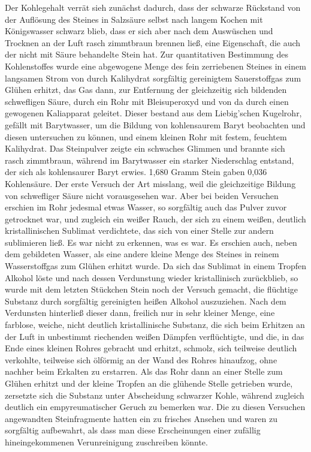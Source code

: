 \documentclass[a4paper, 11pt, oneside]{article}
\begin{document}
Der Kohlegehalt verrät sieh zunächst dadurch, dass der schwarze Rückstand von der Auflösung des Steines in Salzsäure selbst nach langem Kochen mit Königswasser schwarz blieb, dass er sich aber nach dem Auswüschen und Trocknen an der Luft rasch zimmtbraun brennen ließ, eine Eigenschaft, die auch der nicht mit Säure behandelte Stein hat. Zur quantitativen Bestimmung des Kohlenstoffes wurde eine abgewogene Menge des fein zerriebenen Steines in einem langsamen Strom von durch Kalihydrat sorgfältig gereinigtem Sauerstoffgas zum Glühen erhitzt, das Gas dann, zur Entfernung der gleichzeitig sich bildenden schwefligen Säure, durch ein Rohr mit Bleisuperoxyd und von da durch einen gewogenen Kaliapparat geleitet. Dieser bestand aus dem Liebig’schen Kugelrohr, gefällt mit Barytwasser, um die Bildung von kohlensaurem Baryt beobachten und diesen untersuchen zu können, und einem kleinen Rohr mit festem, feuchtem Kalihydrat. Das Steinpulver zeigte ein schwaches Glimmen und brannte sich rasch zimmtbraun, während im Barytwasser ein starker Niederschlag entstand, der sich als kohlensaurer Baryt erwies. 1,680 Gramm Stein gaben 0,036 Kohlensäure. Der erste Versuch der Art misslang, weil die gleichzeitige Bildung von schwefliger Säure nicht vorausgesehen war. Aber bei beiden Versuchen erschien im Rohr jedesmal etwas Wasser, so sorgfältig auch das Pulver zuvor getrocknet war, und zugleich ein weißer Rauch, der sich zu einem weißen, deutlich kristallinischen Sublimat verdichtete, das sich von einer Stelle zur andern sublimieren ließ. Es war nicht zu erkennen, was es war. Es erschien auch, neben dem gebildeten Wasser, als eine andere kleine Menge des Steines in reinem Wasserstoffgas zum Glühen erhitzt wurde. Da sich das Sublimat in einem Tropfen Alkohol löste und nach dessen Verdunstung wieder kristallinisch zurückblieb, so wurde mit dem letzten Stückchen Stein noch der Versuch gemacht, die flüchtige Substanz durch sorgfältig gereinigten heißen Alkohol auszuziehen. Nach dem Verdunsten hinterließ dieser dann, freilich nur in sehr kleiner Menge, eine farblose, weiche, nicht deutlich kristallinische Substanz, die sich beim Erhitzen an der Luft in unbestimmt riechenden weißen Dämpfen verflüchtigte, und die, in das Ende eines kleinen Rohres gebracht und erhitzt, schmolz, sich teilweise deutlich verkohlte, teilweise sich ölförmig an der Wand des Rohres hinaufzog, ohne nachher beim Erkalten zu erstarren. Als das Rohr dann an einer Stelle zum Glühen erhitzt und der kleine Tropfen an die glühende Stelle getrieben wurde, zersetzte sich die Substanz unter Abscheidung schwarzer Kohle, während zugleich deutlich ein empyreumatischer Geruch zu bemerken war. Die zu diesen Versuchen angewandten Steinfragmente hatten ein zu frisches Ansehen und waren zu sorgfältig aufbewahrt, als dass man diese Erscheinungen einer zufällig hineingekommenen Verunreinigung zuschreiben könnte.
\end{document}
